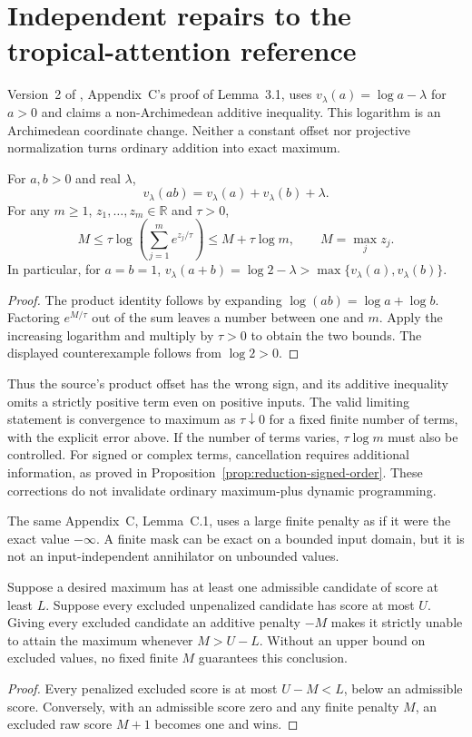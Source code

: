 \section{Independent repairs to the tropical-attention reference}

Version~2 of \citet{ToricAuditHashemi2025}, Appendix~C's proof of
Lemma~3.1, uses $v_\lambda(a)=\log a-\lambda$ for $a>0$ and claims a
non-Archimedean additive inequality. This logarithm is an Archimedean
coordinate change. Neither a constant offset nor projective normalization
turns ordinary addition into exact maximum.

\begin{proposition}
\label{prop:tropical-log-repair}
For $a,b>0$ and real $\lambda$,
\[
 v_\lambda(ab)=v_\lambda(a)+v_\lambda(b)+\lambda.
\]
For any $m\ge1$, $z_1,\ldots,z_m\in\mathbb R$ and $\tau>0$,
\[
 M\le\tau\log\left(\sum_{j=1}^m e^{z_j/\tau}\right)
 \le M+\tau\log m,
 \qquad M=\max_j z_j.
\]
In particular, for $a=b=1$,
$v_\lambda(a+b)=\log2-\lambda>
\max\{v_\lambda(a),v_\lambda(b)\}$.
\end{proposition}
\begin{proof}
The product identity follows by expanding $\log(ab)=\log a+\log b$.
Factoring $e^{M/\tau}$ out of the sum leaves a number between one and
$m$. Apply the increasing logarithm and multiply by $\tau>0$ to obtain
the two bounds. The displayed counterexample follows from $\log2>0$.
\end{proof}

Thus the source's product offset has the wrong sign, and its additive
inequality omits a strictly positive term even on positive inputs.
The valid limiting statement is convergence to maximum as $\tau\downarrow0$
for a fixed finite number of terms, with the explicit error above. If the
number of terms varies, $\tau\log m$ must also be controlled.
For signed or complex terms, cancellation requires additional information,
as proved in Proposition~\ref{prop:reduction-signed-order}. These
corrections do not invalidate ordinary maximum-plus dynamic programming.

The same Appendix~C, Lemma~C.1, uses a large finite penalty as if it were
the exact value $-\infty$. A finite mask can be exact on a bounded input
domain, but it is not an input-independent annihilator on unbounded values.

\begin{proposition}
\label{prop:tropical-finite-mask}
Suppose a desired maximum has at least one admissible candidate of score
at least $L$. Suppose every excluded unpenalized candidate has score at
most $U$. Giving every excluded candidate an additive penalty $-M$ makes
it strictly unable to attain the maximum whenever $M>U-L$.
Without an upper bound on excluded values, no fixed finite $M$ guarantees
this conclusion.
\end{proposition}
\begin{proof}
Every penalized excluded score is at most $U-M<L$, below an admissible
score. Conversely, with an admissible score zero and any finite penalty
$M$, an excluded raw score $M+1$ becomes one and wins.
\end{proof}

